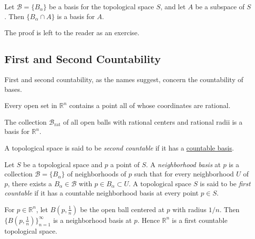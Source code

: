 \begin{proposition}
	Let $\mathcal{B} = \{B_\alpha\}$ be a basis for the topological space
	$S$, and let $A$ be a subspace of $S$. Then $\{B_\alpha\cap A\}$ is a
	basis for $A$.
\end{proposition}


The proof is left to the reader as an exercise.



\subsection{First and Second Countability}

First and second countability, as the names suggest, concern the countability
of bases.


\begin{lemma}
	Every open set in $\mathbb{R}^n$ contains a point all of whose
	coordinates are rational.
\end{lemma}


\begin{proposition}
	The collection $\mathcal{B}_{\text{rat}}$ of all open balls with
	rational centers and rational radii is a basis for $\mathbb{R}^n$.

\end{proposition}

\begin{definition}
	A topological space is said to be \emph{second countable} if it has a
	\underline{countable basis}.
\end{definition}

\begin{definition}
	Let $S$ be a topological space and $p$ a point of $S$. A
	\emph{neighborhood basis} at $p$ is a collection $\mathcal{B} =
		\{B_\alpha\}$ of neighborhoods of $p$ such that for every neighborhood
	$U$ of $p$, there exists a $B_\alpha\in\mathcal{B}$ with $p\in B_\alpha
		\subset U$. A topological space $S$ is said to be \emph{first
		countable} if it has a countable neighborhood basis at every point
	$p\in S$.
\end{definition}

\begin{example}
	For $p\in\mathbb{R}^n$, let $B(p,\frac1n)$ be the open ball centered at
	$p$ with radius $1/n$. Then $\{B(p,\frac1n)\}_{n=1}^\infty$ is a
	neighborhood basis at $p$. Hence $\mathbb{R}^n$ is a first countable
	topological space.
\end{example}


